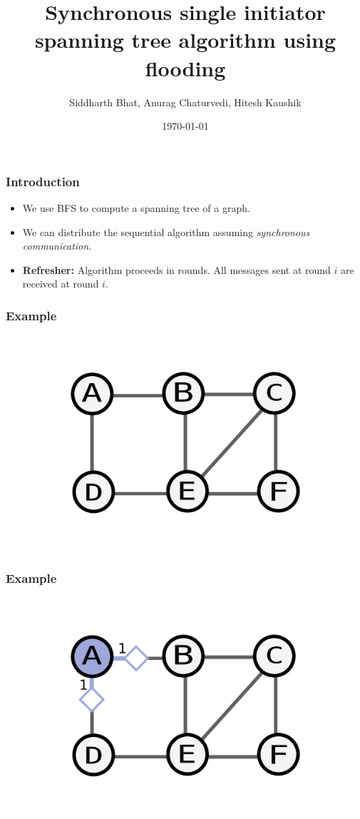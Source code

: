 \documentclass{beamer}
\title{Synchronous single initiator spanning tree algorithm using flooding}
\author{Siddharth Bhat, Anurag Chaturvedi, Hitesh Kaushik}
\date{\today}
\begin{document}
\begin{frame}
\titlepage
\end{frame}

\begin{frame}
    \frametitle{Introduction}
    \begin{itemize}
        \item We use BFS to compute a spanning tree of a graph. \pause
        \item We can distribute the sequential algorithm assuming \textit{synchronous communication}. \pause
        \item \textbf{Refresher:} Algorithm proceeds in rounds. All messages sent at round $i$ are received at round $i$.
    \end{itemize}
\end{frame}


\begin{frame}
    \frametitle{Example}
    \begin{figure}
    \includegraphics[width=0.5\paperwidth]{base.pdf}
    \end{figure}
\end{frame}

\begin{frame}
    \frametitle{Example}
    \begin{figure}
    \includegraphics[width=0.5\paperwidth]{round1.pdf}
    \end{figure}
\end{frame}
\end{document}
